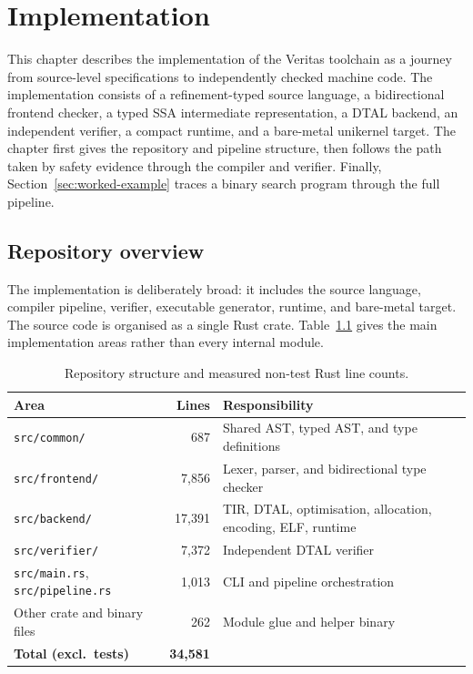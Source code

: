 \chapter{Implementation}\label{ch:impl}
This chapter describes the implementation of the Veritas toolchain as a journey from source-level specifications to independently checked machine code. The implementation consists of a refinement-typed source language, a bidirectional frontend checker, a typed SSA intermediate representation, a DTAL backend, an independent verifier, a compact runtime, and a bare-metal unikernel target. The chapter first gives the repository and pipeline structure, then follows the path taken by safety evidence through the compiler and verifier. Finally, Section~\ref{sec:worked-example} traces a binary search program through the full pipeline.

\section{Repository overview}\label{sec:repo-overview}

The implementation is deliberately broad: it includes the source language, compiler pipeline, verifier, executable generator, runtime, and bare-metal target. The source code is organised as a single Rust crate. Table~\ref{tab:repo} gives the main implementation areas rather than every internal module.
\begin{table}[h]
  \centering
  \small
  \begin{tabularx}{0.96\textwidth}{>{\raggedright\arraybackslash}p{} r >{\raggedright\arraybackslash}X}
    \hline
    \textbf{Area}                         & \textbf{Lines}  & \textbf{Responsibility}                     \\
    \hline
    \texttt{src/common/}                       & 687             & Shared AST, typed AST, and type definitions \\
    \texttt{src/frontend/}                     & 7,856           & Lexer, parser, and bidirectional type checker \\
    \texttt{src/backend/}                      & 17,391          & TIR, DTAL, optimisation, allocation, encoding, ELF, runtime \\
    \texttt{src/verifier/}                     & 7,372           & Independent DTAL verifier                   \\
    \texttt{src/main.rs}, \texttt{src/pipeline.rs} & 1,013       & CLI and pipeline orchestration              \\
    Other crate and binary files               & 262             & Module glue and helper binary               \\
    \hline
    \textbf{Total (excl.\ tests)}              & \textbf{34,581} &                                          \\
    \hline
  \end{tabularx}
  \caption{Repository structure and measured non-test Rust line counts.}
  \label{tab:repo}
\end{table}

